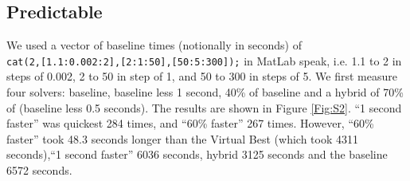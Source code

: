 \documentclass{article}
\begin{document}
\subsection{Predictable}\label{sec:Pr}
We used a vector of baseline times (notionally in seconds) of \\\verb+cat(2,[1.1:0.002:2],[2:1:50],[50:5:300]);+ in MatLab speak, i.e. 1.1 to 2 in steps of 0.002, 2 to 50 in step of 1, and 50 to 300 in steps of 5. We first measure four solvers: baseline, baseline less 1 second, 40\% of baseline and a hybrid of 70\% of (baseline less 0.5 seconds). The results are shown in Figure \ref{Fig:S2}. ``1 second faster'' was quickest 284 times, and ``60\% faster'' 267 times. However, ``60\% faster'' took 48.3 seconds longer than the Virtual Best (which took 4311 seconds),``1 second faster'' 6036 seconds, hybrid  3125 seconds and the baseline 6572 seconds.
\end{document}
